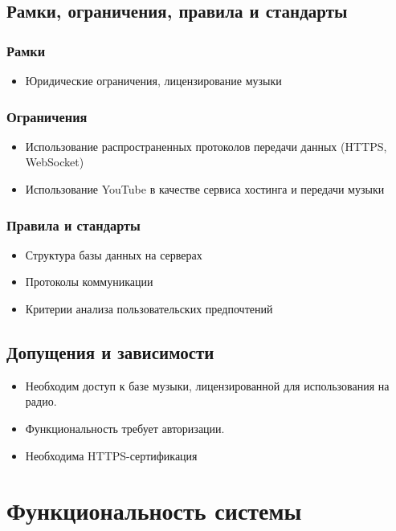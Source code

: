 \subsection{Рамки, ограничения, правила и стандарты}
\subsubsection{Рамки}
\begin{itemize}
    \item Юридические ограничения, лицензирование музыки
\end{itemize}

\subsubsection{Ограничения}
\begin{itemize}
    \item Использование распространенных протоколов передачи данных (HTTPS, WebSocket)
    \item Использование YouTube в качестве сервиса хостинга и передачи музыки
\end{itemize}

\subsubsection{Правила и стандарты}
\begin{itemize}
    \item Структура базы данных на серверах
    \item Протоколы коммуникации
    \item Критерии анализа пользовательских предпочтений
\end{itemize}

\subsection{Допущения и зависимости}
\begin{itemize}
    \item Необходим доступ к базе музыки, лицензированной для использования на радио.
    \item Функциональность требует авторизации.
    \item Необходима HTTPS-сертификация
\end{itemize}

\section{Функциональность системы}
